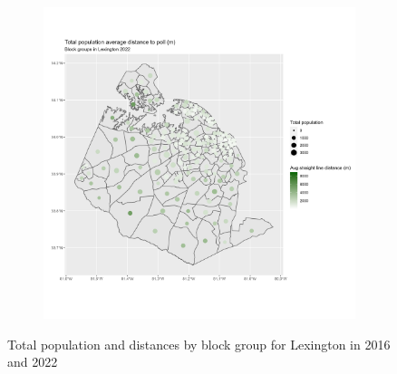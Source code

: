 \documentclass[11pt]{article}
\theoremstyle{remark}
\theoremstyle{definition}
\begin{document}
\begin{figure}
\begin{subfigure}{.5\textwidth}
		\includegraphics[width=\linewidth]{result_analysis/Lexington_County_SC_original_configs/population_pop_and_dist_Lexington_config_original_2022_polls.png}
		\label{sfig:Lexington_2022_bg_dist}
	\end{subfigure}
	\caption{Total population and distances by block group for Lexington in 2016 and 2022}
	\label{fig:Lexington distance Total population maps}
\end{figure}
\end{document}
